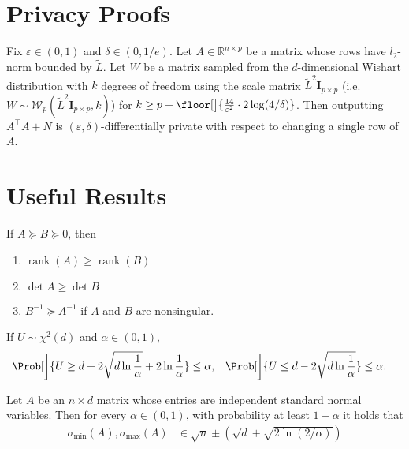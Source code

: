 \documentclass{article}
\newcommand{\inv}[1]{#1^{-1}}
\newcommand{\Real}{\mathds{R}}
\DeclareMathOperator{\rank}{rank}
\DeclarePairedDelimiter{\floor}\lfloor\rfloor
\providecommand\transp{\top}
\let\transpsymbol\transp
\renewcommand{\transp}[1]{#1^\transpsymbol}
\newcommand{\Wishart}{\mathcal{W}}
\newcommand{\Eye}[1]{\bm{I}_{#1 \times #1}}
\newcommand{\XtX}[1]{\transp{#1}{#1}}
\begin{document}
\section{Privacy Proofs}

\begin{theorem}%
  \label{thm:wishart-dp}%
  Fix $\varepsilon\in(0,1)$ and $\delta\in(0,1/e)$.  Let
  $A\in\Real^{n\times p}$ be a matrix whose rows have $l_2$-norm
  bounded by $\tilde L$.  Let $W$ be a matrix sampled from the
  $d$-dimensional Wishart distribution with $k$ degrees of freedom
  using the scale matrix $\tilde L^2\Eye{p}$ (i.e.\
  $W \sim \Wishart_p(\tilde L^2\Eye{p}, k)$) for
  $k \ge p + \floor[\big]{\frac{14}{\varepsilon^2}\cdot 2\log(4/\delta)}$.
  Then outputting $\XtX{A} + N$ is
  $(\varepsilon,\delta)$-differentially private with respect to
  changing a single row of $A$.
\end{theorem}

\section{Useful Results}

\begin{claim}%
  \label{claim:psd-matrix-props}%
  If $A \succeq B \succeq 0$, then
  \begin{enumerate}[nolistsep]
  \item $\rank(A) \ge \rank(B)$
  \item $\det A \ge \det B$
  \item $\inv{B} \succeq \inv{A}$ if $A$ and $B$ are nonsingular.
  \end{enumerate}
\end{claim}

\begin{claim}%
  \label{claim:chi2-tails}
  If $U\sim\chi^2(d)$ and $\alpha\in(0,1)$,
  \begin{align*}
    \Prob[\bigg]{U \ge d + 2\sqrt{d\ln\frac{1}{\alpha}} + 2\ln\frac{1}{\alpha}} &\le \alpha,
    & \Prob[\bigg]{U \le d - 2\sqrt{d\ln\frac{1}{\alpha}}} &\le \alpha.
  \end{align*}
\end{claim}

\begin{claim}%
  \label{claim:gaussian-matrix-tails}
  Let $A$ be an $n\times d$ matrix whose entries are independent
  standard normal variables.  Then for every $\alpha\in(0,1)$, with
  probability at least $1-\alpha$ it holds that
  \begin{align*}
    \sigma_{\min}(A), \sigma_{\max}(A) &\in \sqrt{n} \pm (\sqrt{d} + \sqrt{2\ln(2/\alpha)})
  \end{align*}
\end{claim}
\end{document}
